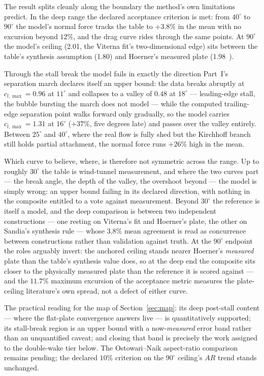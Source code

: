 \documentclass[submit]{aiaa-tc}
\begin{document}
The result splits cleanly along the boundary the method's own
limitations predict. In the deep range the declared acceptance
criterion is met: from $40^\circ$ to $90^\circ$ the model's normal
force tracks the table to $+3.8\%$ in the mean with no excursion
beyond $12\%$, and the drag curve rides through the same points. At
$90^\circ$ the model's ceiling (2.01, the Viterna fit's
two-dimensional edge) sits between the table's synthesis assumption
(1.80) and Hoerner's measured plate
(1.98~\cite{hoerner1965fluiddynamicdrag}).

Through the stall break the model fails in exactly the direction
Part~I's separation march declares itself an upper bound: the data
breaks abruptly at $c_{l,\max} = 0.96$ at $11^\circ$ and collapses to
a valley of $0.48$ at $18^\circ$ --- leading-edge stall, the bubble
bursting the march does not model --- while the computed
trailing-edge separation point walks forward only gradually, so the
model carries $c_{l,\max} = 1.31$ at $16^\circ$ ($+37\%$, five degrees
late) and passes over the valley entirely. Between $25^\circ$ and
$40^\circ$, where the real flow is fully shed but the Kirchhoff
branch still holds partial attachment, the normal force runs $+26\%$
high in the mean.

Which curve to believe, where, is therefore not symmetric across the
range. Up to roughly $30^\circ$ the table is wind-tunnel measurement,
and where the two curves part --- the break angle, the depth of the
valley, the overshoot beyond --- the model is simply wrong: an upper
bound failing in its declared direction, with nothing in the composite
entitled to a vote against measurement. Beyond $30^\circ$ the
reference is itself a model, and the deep comparison is between two
independent constructions --- one resting on Viterna's fit and
Hoerner's plate, the other on Sandia's synthesis rule --- whose
$3.8\%$ mean agreement is read as concurrence between constructions
rather than validation against truth. At the $90^\circ$ endpoint the
roles arguably invert: the anchored ceiling stands nearer Hoerner's
\emph{measured} plate than the table's synthesis value does, so at the
deep end the composite sits closer to the physically measured plate
than the reference it is scored against --- and the $11.7\%$ maximum
excursion of the acceptance metric measures the plate-ceiling
literature's own spread, not a defect of either curve.

The practical reading for the map of
Section~\ref{sec:map}: its deep post-stall content --- where the
flat-plate convergence answers live --- is quantitatively supported;
its stall-break region is an upper bound with a now-\emph{measured}
error band rather than an unquantified caveat; and closing that band
is precisely the work assigned to the double-wake tier
below. The Ostowari--Naik aspect-ratio comparison remains pending; the
declared $10\%$ criterion on the $90^\circ$ ceiling's $AR$ trend
stands unchanged.
\end{document}
